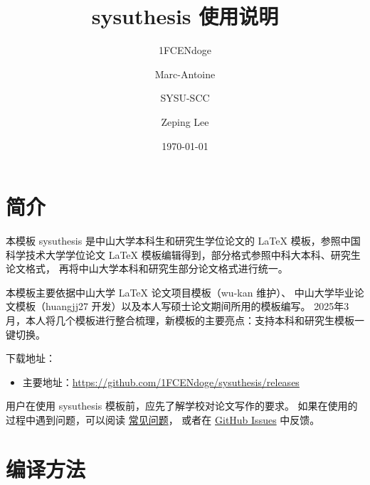 \documentclass[a4paper]{ltxdoc}
\DeclareRobustCommand\pkg{\textsf}
\DeclareRobustCommand\cls{\textsf}
\begin{document}
\title{\cls{sysuthesis} 使用说明}
\author{1FCENdoge\footnotemark[1] \and Marc-Antoine\footnotemark[1] \and SYSU-SCC\footnotemark[3] \and Zeping Lee\footnotemark[2]}
\renewcommand{\thefootnote}{\fnsymbol{footnote}}
\date{\today}
\maketitle



\section{简介}

本模板 \cls{sysuthesis} 是中山大学本科生和研究生学位论文的 \LaTeX{}
模板，参照中国科学技术大学学位论文 \LaTeX{}
模板编辑得到，部分格式参照中科大本科、研究生论文格式，
再将中山大学本科和研究生部分论文格式进行统一。

本模板主要依据中山大学 \LaTeX{} 论文项目模板（wu-kan 维护）、
中山大学毕业论文模板（huangjj27 开发）以及本人写硕士论文期间所用的模板编写。
2025年3月，本人将几个模板进行整合梳理，新模板的主要亮点：支持本科和研究生模板一键切换。

下载地址：
\begin{itemize}
  \item 主要地址：\url{https://github.com/1FCENdoge/sysuthesis/releases}
\end{itemize}

用户在使用 \pkg{sysuthesis} 模板前，应先了解学校对论文写作的要求。
如果在使用的过程中遇到问题，可以阅读
\href{https://github.com/ustctug/ustcthesis/wiki}{常见问题}，
或者在 \href{https://github.com/1FCENdoge/sysuthesis/issues}{GitHub Issues}
中反馈。



\section{编译方法}
\end{document}
